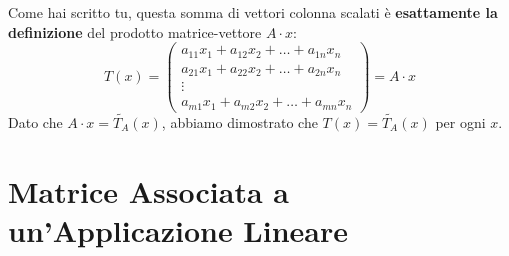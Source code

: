 {{\[    \]
    Come hai scritto tu, questa somma di vettori colonna scalati è \textbf{esattamente la definizione} del prodotto matrice-vettore \(A \cdot x\):
    \[
    T(x) = \begin{pmatrix}
    a_{11} x_1 + a_{12} x_2 + \dots + a_{1n} x_n \\
    a_{21} x_1 + a_{22} x_2 + \dots + a_{2n} x_n \\
    \vdots \\
    a_{m1} x_1 + a_{m2} x_2 + \dots + a_{mn} x_n
    \end{pmatrix} = A \cdot x
    \]
    Dato che \(A \cdot x = \tilde{T_A}(x)\), abbiamo dimostrato che \(T(x) = \tilde{T_A}(x)\) per ogni \(x\).
}
}


\section{Matrice Associata a un'Applicazione Lineare}
